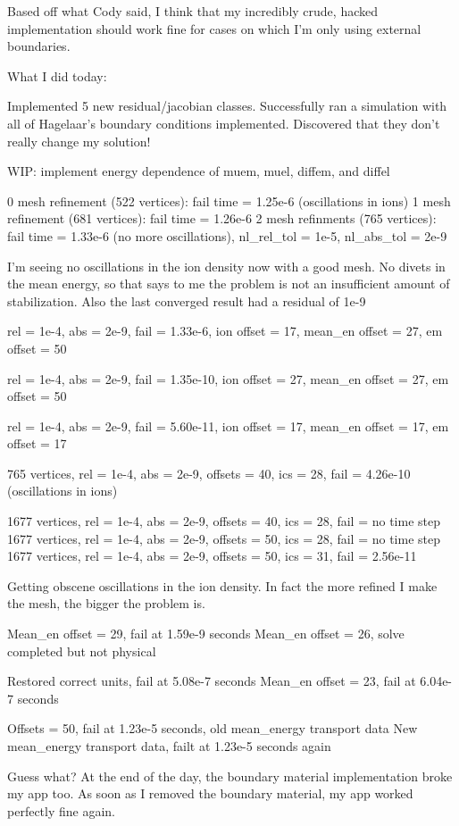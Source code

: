 {Based off what Cody said, I think that my incredibly crude, hacked implementation should work fine for cases on which I'm only using external boundaries.

What I did today:

Implemented 5 new residual/jacobian classes. Successfully ran a simulation with all of Hagelaar's boundary conditions implemented. Discovered that they don't really change my solution!

WIP: implement energy dependence of muem, muel, diffem, and diffel

0 mesh refinement (522 vertices): fail time = 1.25e-6 (oscillations in ions)
1 mesh refinement (681 vertices): fail time = 1.26e-6
2 mesh refinments (765 vertices): fail time = 1.33e-6 (no more oscillations), nl_rel_tol = 1e-5, nl_abs_tol = 2e-9

I'm seeing no oscillations in the ion density now with a good mesh. No divets in the mean energy, so that says to me the problem is not an insufficient amount of stabilization. Also the last converged result had a residual of 1e-9

rel = 1e-4, abs = 2e-9, fail = 1.33e-6, ion offset = 17, mean_en offset = 27, em offset = 50

rel = 1e-4, abs = 2e-9, fail = 1.35e-10, ion offset = 27, mean_en offset = 27, em offset = 50

rel = 1e-4, abs = 2e-9, fail = 5.60e-11, ion offset = 17, mean_en offset = 17, em offset = 17

765 vertices, rel = 1e-4, abs = 2e-9, offsets = 40, ics = 28, fail = 4.26e-10 (oscillations in ions)

1677 vertices, rel = 1e-4, abs = 2e-9, offsets = 40, ics = 28, fail = no time step
1677 vertices, rel = 1e-4, abs = 2e-9, offsets = 50, ics = 28, fail = no time step
1677 vertices, rel = 1e-4, abs = 2e-9, offsets = 50, ics = 31, fail = 2.56e-11

Getting obscene oscillations in the ion density. In fact the more refined I make the mesh, the bigger the problem is.

Mean_en offset = 29, fail at 1.59e-9 seconds
Mean_en offset = 26, solve completed but not physical

Restored correct units, fail at 5.08e-7 seconds
Mean_en offset = 23, fail at 6.04e-7 seconds

Offsets = 50, fail at 1.23e-5 seconds, old mean_energy transport data
New mean_energy transport data, failt at 1.23e-5 seconds again

Guess what? At the end of the day, the boundary material implementation broke my app too. As soon as I removed the boundary material, my app worked perfectly fine again.

}
